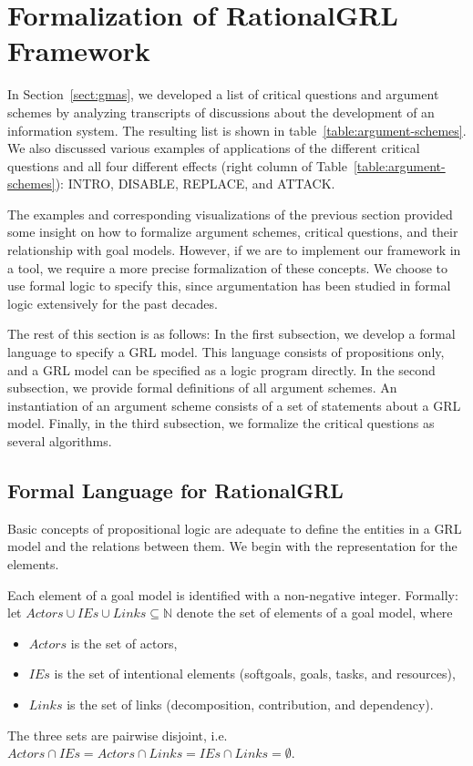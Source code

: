 \section{Formalization of RationalGRL Framework}
\label{sect:formalframework}

In Section~\ref{sect:gmas}, we developed a list of critical questions and argument schemes by analyzing transcripts of discussions about the development of an information system. The resulting list is shown in table~\ref{table:argument-schemes}. We also discussed various examples of applications of the different critical questions and all four different effects (right column of Table~\ref{table:argument-schemes}): INTRO, DISABLE, REPLACE, and ATTACK.

The examples and corresponding visualizations of the previous section provided some insight on how to formalize argument schemes, critical questions, and their relationship with goal models. However, if we are to implement our framework in a tool, we require a more precise formalization of these concepts. We choose to use formal logic to specify this, since argumentation has been studied in formal logic extensively for the past decades. %

The rest of this section is as follows: In the first subsection, we develop a formal language to specify a GRL model. This language consists of propositions only, and a GRL model can be specified as a logic program directly. In the second subsection, we provide formal definitions of all argument schemes. An instantiation of an argument scheme consists of a set of statements about a GRL model. Finally, in the third subsection, we formalize the critical questions as several algorithms.

\subsection{Formal Language for RationalGRL}

Basic concepts of propositional logic are adequate to define the entities in a GRL model and the relations between them. We begin with the representation for the elements.

\begin{definition}
Each element of a goal model is identified with a non-negative integer. Formally: let $Actors\cup IEs \cup Links \subseteq \mathbb{N}$ denote the set of elements of a goal model, where 
\begin{itemize}
\item $Actors$ is the set of actors, 
\item $IEs$ is the set of intentional elements (softgoals, goals, tasks, and resources),
\item $Links$ is the set of links (decomposition, contribution, and dependency). %
\end{itemize}

The three sets are pairwise disjoint, i.e. $Actors \cap IEs = Actors \cap Links = IEs \cap Links = \emptyset$. 
\end{definition}

